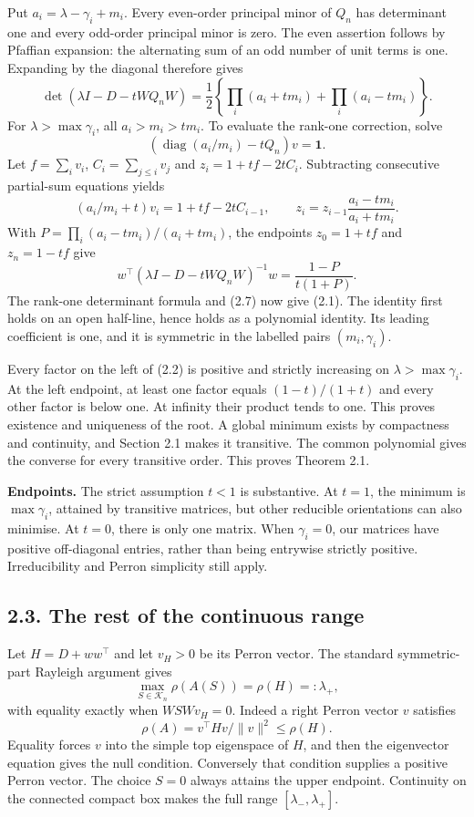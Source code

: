 \documentclass[
  11pt,
  a4paper,
]{article}
\begin{document}
Put \(a_i=\lambda-\gamma_i+m_i\). Every even-order principal minor of
\(Q_n\) has determinant one and every odd-order principal minor is zero.
The even assertion follows by Pfaffian expansion: the alternating sum of
an odd number of unit terms is one. Expanding by the diagonal therefore
gives \[
 \det(\lambda I-D-tWQ_nW)
 =\frac12\left\{\prod_i(a_i+tm_i)+\prod_i(a_i-tm_i)\right\}. \tag{2.7}
\] For \(\lambda>\max\gamma_i\), all \(a_i>m_i>tm_i\). To evaluate the
rank-one correction, solve
\[(\operatorname{diag}(a_i/m_i)-tQ_n)v=\mathbf1.\] Let \(f=\sum_i v_i\),
\(C_i=\sum_{j\le i}v_j\) and \(z_i=1+tf-2tC_i\). Subtracting consecutive
partial-sum equations yields \[
 (a_i/m_i+t)v_i=1+tf-2tC_{i-1},\qquad
 z_i=z_{i-1}\frac{a_i-tm_i}{a_i+tm_i}.
\] With \(P=\prod_i(a_i-tm_i)/(a_i+tm_i)\), the endpoints \(z_0=1+tf\)
and \(z_n=1-tf\) give
\[w^\top(\lambda I-D-tWQ_nW)^{-1}w=\frac{1-P}{t(1+P)}.\] The rank-one
determinant formula and (2.7) now give (2.1). The identity first holds
on an open half-line, hence holds as a polynomial identity. Its leading
coefficient is one, and it is symmetric in the labelled pairs
\((m_i,\gamma_i)\).

Every factor on the left of (2.2) is positive and strictly increasing on
\(\lambda>\max\gamma_i\). At the left endpoint, at least one factor
equals \((1-t)/(1+t)\) and every other factor is below one. At infinity
their product tends to one. This proves existence and uniqueness of the
root. A global minimum exists by compactness and continuity, and Section
2.1 makes it transitive. The common polynomial gives the converse for
every transitive order. This proves Theorem 2.1.

\textbf{Endpoints.} The strict assumption \(t<1\) is substantive. At
\(t=1\), the minimum is \(\max\gamma_i\), attained by transitive
matrices, but other reducible orientations can also minimise. At
\(t=0\), there is only one matrix. When \(\gamma_i=0\), our matrices
have positive off-diagonal entries, rather than being entrywise strictly
positive. Irreducibility and Perron simplicity still apply.

\subsection{2.3. The rest of the continuous
range}\label{the-rest-of-the-continuous-range}

Let \(H=D+ww^\top\) and let \(v_H>0\) be its Perron vector. The standard
symmetric-part Rayleigh argument gives
\[\max_{S\in\mathcal K_n}\rho(A(S))=\rho(H)=:\lambda_+,      \tag{2.8}\]
with equality exactly when \(WSWv_H=0\). Indeed a right Perron vector
\(v\) satisfies \[\rho(A)=v^\top Hv/\|v\|^2\le\rho(H).\] Equality forces
\(v\) into the simple top eigenspace of \(H\), and then the eigenvector
equation gives the null condition. Conversely that condition supplies a
positive Perron vector. The choice \(S=0\) always attains the upper
endpoint. Continuity on the connected compact box makes the full range
\([\lambda_-,\lambda_+]\).
\end{document}
